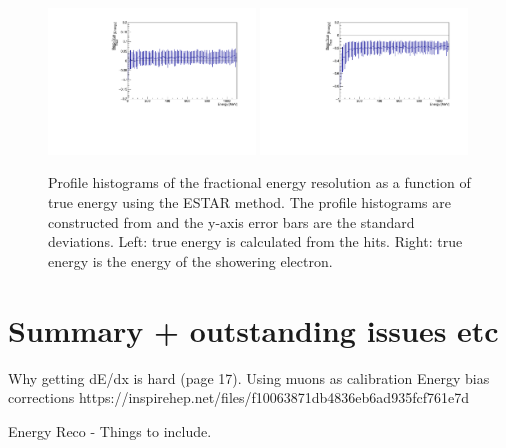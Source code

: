 \begin{figure}[h!]
    \centering
    \includegraphics[width = 0.49\textwidth]{figures-chap4/frac_res_vs_energy_cheating_electron_vertex_plane2_ESTAR_profile.pdf}
    \includegraphics[width = 0.49\textwidth]{figures-chap4/frac_res_vs_energy_cheating_electron_vertex_plane2_ESTAR_showeringE_profile.pdf}
    \caption[Profile histograms of the fractional energy resolution as a function of true energy.]{Profile histograms of the fractional energy resolution as a function of true energy using the ESTAR method. The profile histograms are constructed from  and the y-axis error bars are the standard deviations.  Left: true energy is calculated from the hits. Right: true energy is the energy of the showering electron.}
    \label{fig:reconstruction_as_a_function_of_energy_profile}
\end{figure}



\newpage

\section{Summary + outstanding issues etc}

Why getting dE/dx is hard (page 17).
Using muons as calibration
Energy bias corrections
https://inspirehep.net/files/f10063871db4836eb6ad935fcf761e7d

Energy Reco - Things to include.

